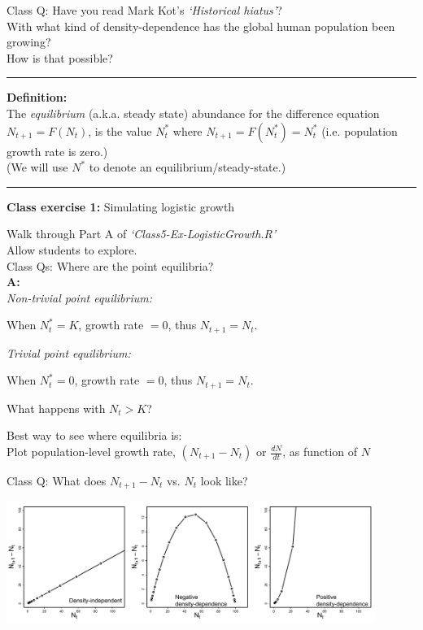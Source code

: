 \documentclass{article}
\newcommand{\note}[1]{\colorbox{gray!30}{#1}}
\newcommand{\ind}{\-\hspace{1cm}}
\begin{document}
\note{Class Q:} Have you read Mark Kot's \emph{`Historical hiatus'}?\\
With what kind of density-dependence has the global human population been growing?\\
How is that possible?

\rule[0.5ex]{\linewidth}{1pt}

\textbf{Definition:}\\
The \emph{equilibrium} (a.k.a. steady state) abundance for the difference equation $N_{t+1} = F(N_t)$, is the value $N_t^*$ where $N_{t+1}=F(N^*_t)=N^*_t$ (i.e. population growth rate is zero.)\\
\ind (We will use $N^*$ to denote an equilibrium/steady-state.)

\rule[0.5ex]{\linewidth}{1pt}

\textbf{Class exercise 1:} Simulating logistic growth

\note{Walk through Part A of \emph{`Class5-Ex-LogisticGrowth.R'}}\\
\note{Allow students to explore.}\\


\note{Class Qs:} Where are the point equilibria?\\
\textbf{A:}\\
\ind \emph{Non-trivial point equilibrium:}\\
\begin{center}
	When $N_t^*=K$, growth rate $=0$, thus $N_{t+1}=N_t$.
\end{center}
\ind \emph{Trivial point equilibrium:}\\
\begin{center}
	When $N_t^*=0$, growth rate $=0$, thus $N_{t+1}=N_t$.
\end{center}

What happens with $N_t>K$?

Best way to see where equilibria is:\\ 
\ind Plot population-level growth rate, $(N_{t+1}-N_t)$ or $\frac{dN}{dt}$, as function of $N$


\pagebreak

\note{Class Q:} What does $N_{t+1}-N_t$ vs. $N_t$ look like?
\begin{center}
\includegraphics[width=12cm]{figs/densdep_popn.pdf}
\end{center}
\end{document}

